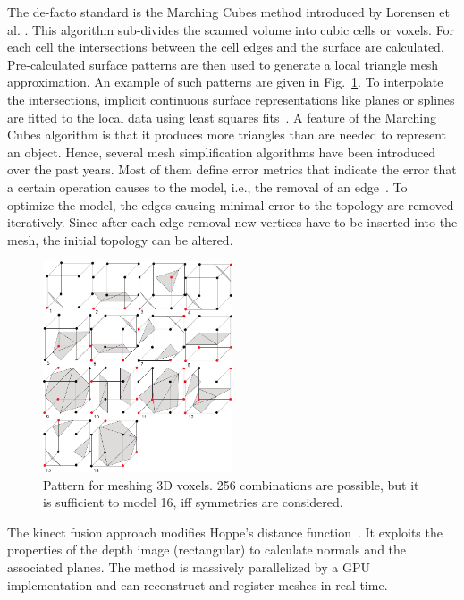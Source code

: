 \documentclass[twocolumn,oneside]{book}
\begin{document}
\begin{itemize}
  The de-facto standard is the Marching Cubes method introduced by
  Lorensen et al. \cite{lorensen87marching}. This algorithm
  sub-divides the scanned volume into cubic cells or voxels. For each
  cell the intersections between the cell edges and the surface are
  calculated. Pre-calculated surface patterns are then used to
  generate a local triangle mesh approximation. An example of such
  patterns are given in Fig.~\ref{fig:patterns}. To interpolate the
  intersections, implicit continuous surface representations like
  planes or splines are fitted to the local data using least squares
  fits~\cite{alexa02computing,hoppe}.
  A feature of the Marching Cubes algorithm is that it produces more
  triangles than are needed to represent an object.  Hence, several
  mesh simplification algorithms have been introduced over the past
  years. Most of them define error metrics that indicate the error
  that a certain operation causes to the model, i.e., the removal of
  an edge~\cite{melax98simple, garland97surface}. To optimize the
  model, the edges causing minimal error to the topology are removed
  iteratively. Since after each edge removal new vertices have to be
  inserted into the mesh, the initial topology can be altered.
\begin{figure}
    \includegraphics[width=0.5\textwidth]{BOOKFIGS/mc_cases_corrected}
\caption{Pattern for meshing 3D voxels. 256 combinations are possible,
  but it is sufficient to model 16, iff symmetries are considered.
\label{fig:patterns}}
\end{figure}

  The kinect fusion approach modifies Hoppe's distance
  function~\cite{kinectfusion}. It exploits the properties of the
  depth image (rectangular) to calculate normals and the associated
  planes. The method is massively parallelized by a GPU implementation
  and can reconstruct and register meshes in real-time.


\end{itemize}
\end{document}
